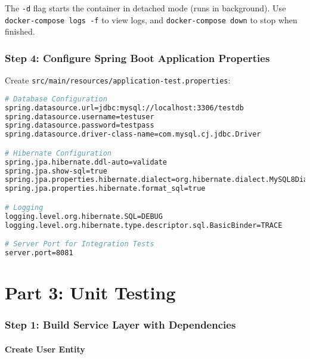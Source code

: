 \documentclass[12pt,a4paper]{article}
\begin{document}
\begin{tipbox}
The \texttt{-d} flag starts the container in detached mode (runs in background). Use \texttt{docker-compose logs -f} to view logs, and \texttt{docker-compose down} to stop when finished.
\end{tipbox}

\section{Step 4: Configure Spring Boot Application Properties}

Create \texttt{src/main/resources/application-test.properties}:

\begin{lstlisting}[language=bash, caption=application-test.properties - Test Profile Configuration]
# Database Configuration
spring.datasource.url=jdbc:mysql://localhost:3306/testdb
spring.datasource.username=testuser
spring.datasource.password=testpass
spring.datasource.driver-class-name=com.mysql.cj.jdbc.Driver

# Hibernate Configuration
spring.jpa.hibernate.ddl-auto=validate
spring.jpa.show-sql=true
spring.jpa.properties.hibernate.dialect=org.hibernate.dialect.MySQL8Dialect
spring.jpa.properties.hibernate.format_sql=true

# Logging
logging.level.org.hibernate.SQL=DEBUG
logging.level.org.hibernate.type.descriptor.sql.BasicBinder=TRACE

# Server Port for Integration Tests
server.port=8081
\end{lstlisting}

\newpage

\part{Part 3: Unit Testing}

\section{Step 1: Build Service Layer with Dependencies}

\subsection{Create User Entity}
\end{document}
